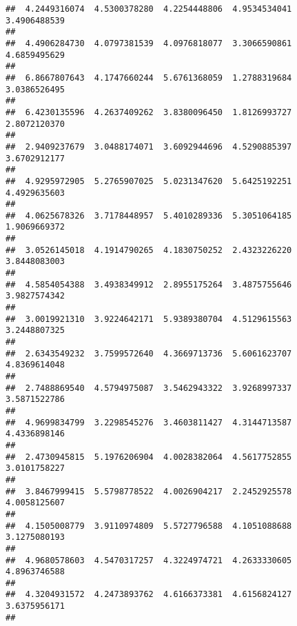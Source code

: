 \documentclass[]{article}
\begin{document}
\begin{verbatim}
##  4.2449316074  4.5300378280  4.2254448806  4.9534534041  3.4906488539 
##                                                                       
##  4.4906284730  4.0797381539  4.0976818077  3.3066590861  4.6859495629 
##                                                                       
##  6.8667807643  4.1747660244  5.6761368059  1.2788319684  3.0386526495 
##                                                                       
##  6.4230135596  4.2637409262  3.8380096450  1.8126993727  2.8072120370 
##                                                                       
##  2.9409237679  3.0488174071  3.6092944696  4.5290885397  3.6702912177 
##                                                                       
##  4.9295972905  5.2765907025  5.0231347620  5.6425192251  4.4929635603 
##                                                                       
##  4.0625678326  3.7178448957  5.4010289336  5.3051064185  1.9069669372 
##                                                                       
##  3.0526145018  4.1914790265  4.1830750252  2.4323226220  3.8448083003 
##                                                                       
##  4.5854054388  3.4938349912  2.8955175264  3.4875755646  3.9827574342 
##                                                                       
##  3.0019921310  3.9224642171  5.9389380704  4.5129615563  3.2448807325 
##                                                                       
##  2.6343549232  3.7599572640  4.3669713736  5.6061623707  4.8369614048 
##                                                                       
##  2.7488869540  4.5794975087  3.5462943322  3.9268997337  3.5871522786 
##                                                                       
##  4.9699834799  3.2298545276  3.4603811427  4.3144713587  4.4336898146 
##                                                                       
##  2.4730945815  5.1976206904  4.0028382064  4.5617752855  3.0101758227 
##                                                                       
##  3.8467999415  5.5798778522  4.0026904217  2.2452925578  4.0058125607 
##                                                                       
##  4.1505008779  3.9110974809  5.5727796588  4.1051088688  3.1275080193 
##                                                                       
##  4.9680578603  4.5470317257  4.3224974721  4.2633330605  4.8963746588 
##                                                                       
##  4.3204931572  4.2473893762  4.6166373381  4.6156824127  3.6375956171 
##                                                                       

\end{verbatim}
\end{document}
